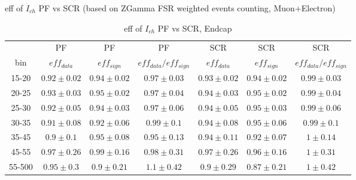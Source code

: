 \documentclass{beamer}
\begin{document}
\begin{frame}{eff of $I_{ch}$ PF vs SCR (based on ZGamma FSR weighted events counting, Muon+Electron)}
{\begin{table}[h]
  \tiny
  \begin{center}
  \caption{ eff of $I_{ch}$ PF vs SCR, Endcap}
  \begin{tabular}{|c|c|c|c|c|c|c|}
 & PF & PF & PF & SCR & SCR & SCR \\
 bin & $eff_{data}$ & $eff_{sign}$ & $eff_{data}/eff_{sign}$ & $eff_{data}$ & $eff_{sign}$ & $eff_{data}/eff_{sign}$ \\ \hline
15-20 &  $0.92\pm0.02$  &  $0.94\pm0.02$  &  $0.97\pm0.03$  &  $0.93\pm0.02$  &  $0.94\pm0.02$  &  $0.99\pm0.03$  \\ \hline 
20-25 &  $0.93\pm0.03$  &  $0.95\pm0.02$  &  $0.97\pm0.04$  &  $0.94\pm0.03$  &  $0.95\pm0.02$  &  $0.99\pm0.04$  \\ \hline 
25-30 &  $0.92\pm0.05$  &  $0.94\pm0.03$  &  $0.97\pm0.06$  &  $0.94\pm0.05$  &  $0.95\pm0.03$  &  $0.99\pm0.06$  \\ \hline 
30-35 &  $0.91\pm0.08$  &  $0.92\pm0.06$  &  $0.99\pm0.1$  &  $0.94\pm0.08$  &  $0.95\pm0.06$  &  $0.99\pm0.1$  \\ \hline 
35-45 &  $0.9\pm0.1$  &  $0.95\pm0.08$  &  $0.95\pm0.13$  &  $0.94\pm0.11$  &  $0.92\pm0.07$  &  $1\pm0.14$  \\ \hline 
45-55 &  $0.97\pm0.26$  &  $0.99\pm0.16$  &  $0.98\pm0.31$  &  $0.97\pm0.26$  &  $0.96\pm0.16$  &  $1\pm0.31$  \\ \hline 
55-500 &  $0.95\pm0.3$  &  $0.9\pm0.21$  &  $1.1\pm0.42$  &  $0.9\pm0.29$  &  $0.87\pm0.21$  &  $1\pm0.42$  \\ \hline 
  \end{tabular}
  \label{tab:sf_PFvsSCR_Endcap}
  \end{center}
\end{table}

}
\end{frame}
\end{document}
